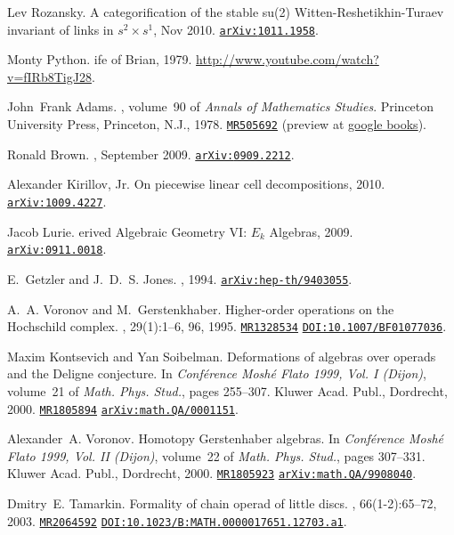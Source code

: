 \documentclass{pnastwo}
\newcommand{\arxiv}[1]{\href{http://arxiv.org/abs/#1}{\tt arXiv:\nolinkurl{#1}}}
\newcommand{\doi}[1]{\href{http://dx.doi.org/#1}{{\tt DOI:#1}}}
\newcommand{\mathscinet}[1]{\href{http://www.ams.org/mathscinet-getitem?mr=#1}{\tt #1}}
\newcommand{\googlebooks}[1]{(preview at \href{http://books.google.com/books?id=#1}{google books})}
\begin{document}
\begin{article}
\begin{thebibliography}{10}
Lev Rozansky.
\newblock A categorification of the stable su(2)
  {W}itten-{R}eshetikhin-{T}uraev invariant of links in $s^2 \times s^1$, Nov
  2010.
\newblock \arxiv{1011.1958}.

Monty Python.
ife of {B}rian, 1979.
\newblock \url{http://www.youtube.com/watch?v=fIRb8TigJ28}.

John~Frank Adams.
, volume~90 of {\em Annals of Mathematics
  Studies}.
\newblock Princeton University Press, Princeton, N.J., 1978.
\newblock \mathscinet{MR505692} \googlebooks{e2rYkg9lGnsC}.


Ronald {Brown}.
, September 2009.
\newblock \arxiv{0909.2212}.

Alexander Kirillov, Jr.
\newblock On piecewise linear cell decompositions, 2010.
\newblock \arxiv{1009.4227}.

Jacob Lurie.
erived {A}lgebraic {G}eometry {VI}: {$E_k$} {A}lgebras, 2009.
\newblock \arxiv{0911.0018}.

E.~Getzler and J.~D.~S. Jones.
, 1994.
\newblock \arxiv{hep-th/9403055}.

A.~A. Voronov and M.~Gerstenkhaber.
\newblock Higher-order operations on the {H}ochschild complex.
, 29(1):1--6, 96, 1995.
\newblock \mathscinet{MR1328534} \doi{10.1007/BF01077036}.

Maxim Kontsevich and Yan Soibelman.
\newblock Deformations of algebras over operads and the {D}eligne conjecture.
\newblock In {\em Conf\'erence {M}osh\'e {F}lato 1999, {V}ol. {I} ({D}ijon)},
  volume~21 of {\em Math. Phys. Stud.}, pages 255--307. Kluwer Acad. Publ.,
  Dordrecht, 2000.
\newblock \mathscinet{MR1805894} \arxiv{math.QA/0001151}.

Alexander~A. Voronov.
\newblock Homotopy {G}erstenhaber algebras.
\newblock In {\em Conf\'erence {M}osh\'e {F}lato 1999, {V}ol. {II} ({D}ijon)},
  volume~22 of {\em Math. Phys. Stud.}, pages 307--331. Kluwer Acad. Publ.,
  Dordrecht, 2000.
\newblock \mathscinet{MR1805923} \arxiv{math.QA/9908040}.

Dmitry~E. Tamarkin.
\newblock Formality of chain operad of little discs.
, 66(1-2):65--72, 2003.
\newblock \mathscinet{MR2064592} \doi{10.1023/B:MATH.0000017651.12703.a1}.

\end{thebibliography}



\end{article}
\end{document}
